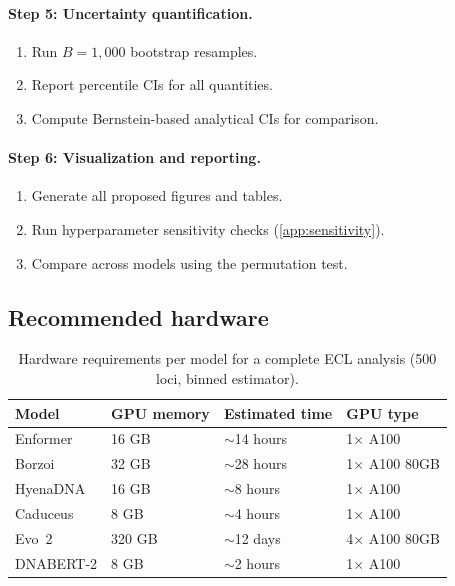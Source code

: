 \paragraph{Step 5: Uncertainty quantification.}
\begin{enumerate}[leftmargin=2em, label=(5.\arabic*)]
\item Run $B=1{,}000$ bootstrap resamples.
\item Report percentile CIs for all quantities.
\item Compute Bernstein-based analytical CIs for comparison.
\end{enumerate}

\paragraph{Step 6: Visualization and reporting.}
\begin{enumerate}[leftmargin=2em, label=(6.\arabic*)]
\item Generate all proposed figures and tables.
\item Run hyperparameter sensitivity checks (\cref{app:sensitivity}).
\item Compare across models using the permutation test.
\end{enumerate}

\subsection{Recommended hardware}

\begin{table}[H]
\centering
\caption{Hardware requirements per model for a complete ECL analysis (500 loci, binned estimator).}
\label{tab:hardware}
\small
\begin{tabular}{@{}l l l l@{}}
\toprule
\textbf{Model} & \textbf{GPU memory} & \textbf{Estimated time} & \textbf{GPU type} \\
\midrule
Enformer & 16 GB & $\sim$14 hours & 1$\times$ A100 \\
Borzoi & 32 GB & $\sim$28 hours & 1$\times$ A100 80GB \\
HyenaDNA & 16 GB & $\sim$8 hours & 1$\times$ A100 \\
Caduceus & 8 GB & $\sim$4 hours & 1$\times$ A100 \\
Evo~2 & 320 GB & $\sim$12 days & 4$\times$ A100 80GB \\
DNABERT-2 & 8 GB & $\sim$2 hours & 1$\times$ A100 \\
\bottomrule
\end{tabular}
\end{table}

